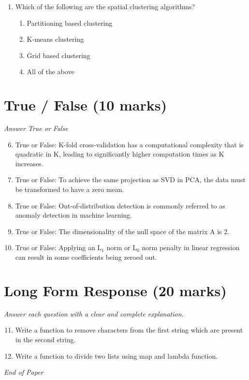 \documentclass[12pt]{article}
\begin{document}
\begin{enumerate}[label=\arabic*.]
\begin{enumerate}[label=(\alph*)]
    \item P(B) decreases
    \item All of above
\end{enumerate}
\item Which of the following are the spatial clustering algorithms?
\begin{enumerate}[label=(\alph*)]
    \item Partitioning based clustering
    \item K-means clustering
    \item Grid based clustering
    \item All of the above
\end{enumerate}
\end{enumerate}

\section*{True / False (10 marks)}
\textit{Answer True or False}
\begin{enumerate}[label=\arabic*.]
\setcounter{enumi}{5}
\item True or False: K-fold cross-validation has a computational complexity that is quadratic in K, leading to significantly higher computation times as K increases.
\item True or False: To achieve the same projection as SVD in PCA, the data must be transformed to have a zero mean.
\item True or False: Out-of-distribution detection is commonly referred to as anomaly detection in machine learning.
\item True or False: The dimensionality of the null space of the matrix A is 2.
\item True or False: Applying an L$_{1}$ norm or L$_{0}$ norm penalty in linear regression can result in some coefficients being zeroed out.
\end{enumerate}

\section*{Long Form Response (20 marks)}
\textit{Answer each question with a clear and complete explanation.}
\begin{enumerate}[label=\arabic*.]
\setcounter{enumi}{10}
\item Write a function to remove characters from the first string which are present in the second string.
\item Write a function to divide two lists using map and lambda function.
\end{enumerate}

\vfill
\noindent\textit{End of Paper}
\end{document}
